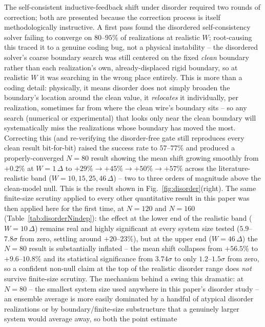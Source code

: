 \documentclass[aps,physrev,reprint,superscriptaddress,amsmath,amssymb,floatfix]{revtex4-2}
\begin{document}
The self-consistent inductive-feedback shift under disorder required two
rounds of correction; both are presented because the correction process
is itself methodologically instructive. A first
pass found the disordered self-consistency solver failing to converge on
$80$--$95\%$ of realizations at realistic $W$; root-causing this traced
it to a genuine coding bug, not a physical instability -- the disordered
solver's coarse boundary search was still centered on the fixed
\emph{clean} boundary rather than each realization's own,
already-displaced rigid boundary, so at realistic $W$ it was searching in
the wrong place entirely. This is more than a coding detail: physically,
it means disorder does not simply broaden the boundary's location around
the clean value, it \emph{relocates} it individually, per realization,
sometimes far from where the clean wire's boundary sits -- so any search
(numerical or experimental) that looks only near the clean boundary will
systematically miss the realizations whose boundary has moved the most.
Correcting this (and re-verifying the
disorder-free gate still reproduces every clean result bit-for-bit)
raised the success rate to $57$--$77\%$ and produced a properly-converged
$N=80$ result showing the mean shift growing smoothly from $+0.2\%$ at
$W=1\,\Delta$ to $+29\%\to+45\%\to+50\%\to+57\%$ across the
literature-realistic band ($W=10,15,25,46\,\Delta$) -- two to three
orders of magnitude above the clean-model null. This is the result shown
in Fig.~\ref{fig:disorder}(right). The same finite-size scrutiny applied
to every other quantitative result in this paper was then applied here
for the first time, at $N=120$ and $N=160$ (Table~\ref{tab:disorderNindep}):
the effect at the lower end of the realistic band ($W=10\,\Delta$)
remains real and highly significant at every system size tested
($5.9$--$7.8\sigma$ from zero, settling around $+20$--$23\%$), but at the
upper end ($W=46\,\Delta$) the $N=80$ result is substantially inflated --
the mean shift collapses from $+56.5\%$ to $+9.6$--$10.8\%$ and its
statistical significance from $3.74\sigma$ to only $1.2$--$1.5\sigma$
from zero, so a confident non-null claim at the top of the realistic
disorder range does \emph{not} survive finite-size scrutiny. The
mechanism behind a swing this dramatic: at $N=80$ --
the smallest system size used anywhere in this paper's disorder study --
an ensemble average is more easily dominated by a handful of atypical
disorder realizations or by boundary/finite-size substructure that a
genuinely larger system would average away, so both the point estimate
\end{document}
